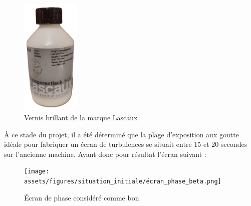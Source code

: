 \begin{figure}[H]
  \centering
  \includegraphics[width = 0.25\textwidth]{assets/figures/situation_initiale/Lascaux_vernis_brillant.png}
  \caption{Vernis brillant de la marque Lascaux}
\end{figure}

À ce stade du projet, il a été déterminé que la plage d'exposition aux goutte idéale pour fabriquer un écran de turbulences se situait entre 15 et 20 secondes sur l'ancienne machine.\footnotemark
Ayant donc pour résultat l'écran suivant :
\begin{figure}[H]
  \centering
  \texttt{[image: assets/figures/situation\_initiale/écran\_phase\_beta.png]}
  \caption{Écran de phase considéré comme bon}
\end{figure}

